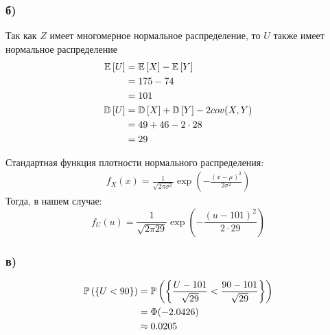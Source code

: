 \documentclass{article}
\begin{document}
\subsubsection*{б)}
Так как $Z$ имеет многомерное нормальное распределение, то $U$ также имеет нормальное распределение
\begin{equation*}
    \begin{aligned}
        \mathbb{E}\left[U\right]&=\mathbb{E}\left[X\right]-\mathbb{E}\left[Y\right]\\
        &=175-74\\
        &=101\\
        \mathbb{D}\left[U\right]&=\mathbb{D}\left[X\right]+\mathbb{D}\left[Y\right]-2cov(X,Y)\\
        &=49+46-2\cdot28\\
        &=29
    \end{aligned}
\end{equation*}

Стандартная функция плотности нормального распределения:
\begin{equation*}
    \begin{aligned}
        f_X(x)=\frac{1}{\sqrt{2\pi\sigma^2}}\exp\left(-\frac{(x-\mu)^2}{2\sigma^2}\right)
    \end{aligned}
\end{equation*}
Тогда, в нашем случае:
\begin{equation*}
    f_U(u)=\frac{1}{\sqrt{2\pi 29}}\exp\left(-\frac{(u-101)^2}{2\cdot29}\right)
\end{equation*}


\subsubsection*{в)}
\begin{equation*}
    \begin{aligned}
        \mathbb{P}\left(\{U<90\}\right)&=\mathbb{P}\left(\left\{\frac{U-101}{\sqrt{29}}<\frac{90-101}{\sqrt{29}}\right\}\right)\\
        &=\Phi(-2.0426)\\
        &\approx0.0205
    \end{aligned}
\end{equation*}
\end{document}
